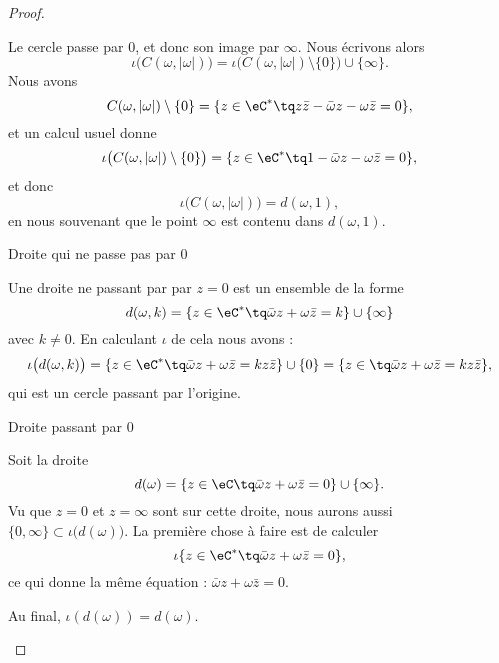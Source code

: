 \begin{proof}
\begin{subproof}
            Le cercle passe par \( 0\), et donc son image par \( \infty\). Nous écrivons alors
            \begin{equation}
                \iota\big( C(\omega,| \omega |) \big)=\iota\big( C(\omega,| \omega |)\setminus\{ 0 \} \big)\cup\{ \infty \}.
            \end{equation}
            Nous avons 
            \begin{equation}
                C(\omega,| \omega |)\setminus \{ 0 \} =\{ z\in \eC^*\tq z\bar z-\bar \omega z-\omega\bar z=0 \},
            \end{equation}
            et un calcul usuel donne
            \begin{equation}
                \iota\big( C(\omega,| \omega |)\setminus \{ 0 \}  \big)=\{ z\in \eC^*\tq 1-\bar \omega z-\omega\bar z=0 \},
            \end{equation}
            et donc
            \begin{equation}
                \iota\big( C(\omega,| \omega |) \big)=d(\omega,1),
            \end{equation}
            en nous souvenant que le point \( \infty\) est contenu dans \( d(\omega,1)\).

        \item[Droite qui ne passe pas par \( 0\)]

            Une droite ne passant par par \( z=0\) est un ensemble de la forme
            \begin{equation}
                d(\omega,k)=\{ z\in \eC^*\tq \bar\omega z+\omega\bar z=k \}\cup \{ \infty \}
            \end{equation}
            avec \( k\neq 0\). En calculant \( \iota\) de cela nous avons :
            \begin{equation}
                \iota\big( d(\omega,k) \big)=\{ z\in \eC^*\tq \bar \omega z+\omega\bar z=kz\bar z \}\cup\{ 0 \}=  \{ z\in\tq \bar \omega z+\omega\bar z=kz\bar z \},
            \end{equation}
            qui est un cercle passant par l'origine.

        \item[Droite passant par \( 0\)]

            Soit la droite
            \begin{equation}
                d(\omega)=\{ z\in\eC\tq \bar \omega z+\omega\bar z=0 \}\cup\{ \infty \}.
            \end{equation}
            Vu que \( z=0\) et \( z=\infty\) sont sur cette droite, nous aurons aussi \( \{ 0,\infty \}\subset\iota\big( d(\omega) \big)\). La première chose à faire est de calculer
            \begin{equation}
                \iota\{ z\in \eC^*\tq \bar \omega z+\omega\bar z=0 \},
            \end{equation}
            ce qui donne la même équation : \( \bar\omega z+\omega\bar z=0\).

            Au final, \( \iota(d(\omega))=d(\omega)\).
    \end{subproof}
\end{proof}

